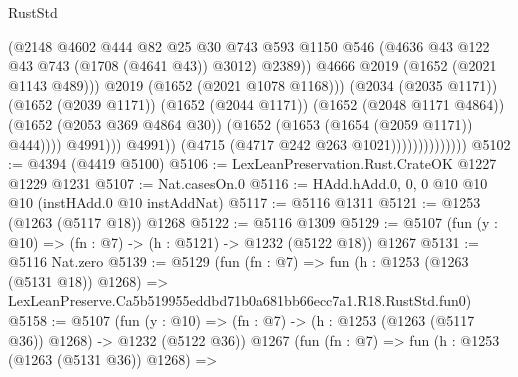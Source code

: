 \begin{lexlean}{RustStd}
\begin{coremodule}
                                                (@2148
                                                  @4602
                                                  @444
                                                  @82
                                                  @25
                                                  @30
                                                  @743
                                                  @593
                                                  @1150
                                                  @546
                                                  (@4636
                                                    @43
                                                    @122
                                                    @43
                                                    @743
                                                    (@1708 (@4641 @43))
                                                    @3012)
                                                  @2389))
                                              @4666
                                              @2019
                                              (@1652 (@2021 @1143 @489)))
                                            @2019
                                            (@1652 (@2021 @1078 @1168)))
                                          (@2034 (@2035 @1171))
                                          (@1652 (@2039 @1171))
                                          (@1652 (@2044 @1171))
                                          (@1652 (@2048 @1171 @4864))
                                          (@1652 (@2053 @369 @4864 @30))
                                          (@1652 (@1653 (@1654 (@2059 @1171)) @444))))
                                      @4991)))
                                @4991))
                            (@4715 (@4717 @242 @263 @1021))))))))))))))
@5102 := @4394 (@4419 @5100)
@5106 := LexLeanPreservation.Rust.CrateOK @1227 @1229 @1231
@5107 := Nat.casesOn.{0}
@5116 := HAdd.hAdd.{0, 0, 0} @10 @10 @10 (instHAdd.{0} @10 instAddNat)
@5117 := @5116 @1311
@5121 := @1253 (@1263 (@5117 @18)) @1268
@5122 := @5116 @1309
@5129 := @5107 (fun (y : @10) => (fn : @7) -> (h : @5121) -> @1232 (@5122 @18)) @1267
@5131 := @5116 Nat.zero
@5139 := @5129
    (fun (fn : @7) =>
    fun (h : @1253 (@1263 (@5131 @18)) @1268) =>
    LexLeanPreserve.Ca5b519955eddbd71b0a681bb66ecc7a1.R18.RustStd.fun0)
@5158 := @5107
    (fun (y : @10) => (fn : @7) -> (h : @1253 (@1263 (@5117 @36)) @1268) -> @1232 (@5122 @36))
    @1267
    (fun (fn : @7) =>
    fun (h : @1253 (@1263 (@5131 @36)) @1268) =>

\end{coremodule}
\end{lexlean}
